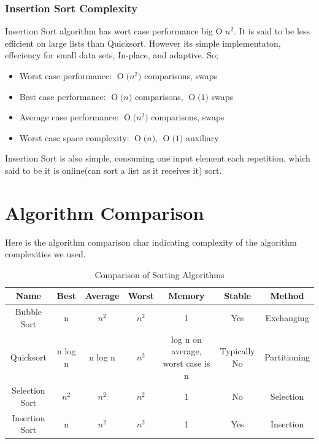 \documentclass{article}
\newcommand{\BigO}[1]{\ensuremath{\operatorname{O}\bigl(#1\bigr)}}
\begin{document}
	
		\subsubsection{Insertion Sort Complexity}
		Insertion Sort algorithm has wort case performance big O \emph{$n^{2}$}. It is said to be less efficient on large lists than Quicksort. However its simple implementaton, effeciency for small data sets, In-place, and adaptive. So;
		\begin{itemize}
		\item Worst case performance: \BigO{n^{2}} comparisons, swaps
		\item Best case performance: \BigO{n} comparisons, \BigO{1} swaps
		\item Average case performance: \BigO{n^{2}} comparisons, swaps
		\item Worst case space complexity: \BigO{n}, \BigO{1} auxiliary
		\end{itemize}
		Insertion Sort is also simple, consuming one input element each repetition, which said to be it is online(can sort a list as it receives it) sort. 



\section{Algorithm Comparison}

Here is the algorithm comparison char indicating complexity of the algorithm complexities we used.

\begin{table}[H]
    \begin{tabular}{|c|c|c|c|c|c|c|}
    \hline
    Name           & Best    & Average & Worst   & Memory                            & Stable       & Method       \\ \hline
    Bubble Sort    & n       & $n^{2}$ & $n^{2}$ & 1                                 & Yes          & Exchanging   \\ \hline
    Quicksort      & n log n & n log n & $n^{2}$ & log n on average, worst case is n & Typically No & Partitioning \\ \hline
    Selection Sort & $n^{2}$ & $n^{2}$ & $n^{2}$ & 1                                 & No           & Selection    \\ \hline
    Insertion Sort & n       & $n^{2}$ & $n^{2}$ & 1                                 & Yes          & Insertion    \\ \hline
    \end{tabular}
    \caption {Comparison of Sorting Algorithms}
\end{table}
\end{document}
